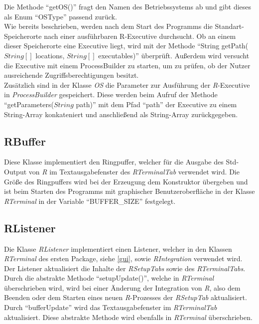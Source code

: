 \documentclass[a4paper, 12pt]{report} %
\begin{document}
Die Methode "`getOS()"' fragt den Namen des Betriebssystems ab und gibt dieses als Enum "`OSType"' passend zurück.\\

Wie bereits beschrieben, werden nach dem Start des Programms die Standart-Speicherorte nach einer ausführbaren R-Executive durchsucht. Ob an einem dieser Speicherorte eine Executive liegt, wird mit der Methode "`String getPath($String[]$ locations, $String[]$ executables)"' überprüft. Außerdem wird versucht die Executive mit einem ProcessBuilder zu starten, um zu prüfen, ob der Nutzer ausreichende Zugriffsberechtigungen besitzt.\\

Zusätzlich sind in der Klasse \textit{OS} die Parameter zur Ausführung der \textit{R}-Executive in \textit{ProcessBuilder} gespeichert. Diese werden beim Aufruf der Methode "`getParameters($String$ path)"' mit dem Pfad "`path"' der Executive zu einem String-Array konkateniert und anschließend als String-Array zurückgegeben.

\subsection{RBuffer} \label{RBuffer}

Diese Klasse implementiert den Ringpuffer, welcher für die Ausgabe des Std-Output von \textit{R} im Textausgabefenster des \textit{RTerminalTab} verwendet wird.
Die Größe des Ringpuffers wird bei der Erzeugung dem Konstruktor übergeben und ist beim Starten des Programms mit graphischer Benutzeroberfläche in der Klasse \textit{RTerminal} in der Variable "`BUFFER\_SIZE"' festgelegt.

\subsection{RListener} \label{RListener}

Die Klasse \textit{RListener} implementiert einen Listener, welcher in den Klassen \textit{RTerminal} des ersten Package, siehe \ref{gui}, sowie \textit{RIntegration} verwendet wird. \\

Der Listener aktualisiert die Inhalte der \textit{RSetupTabs} sowie des \textit{RTerminalTabs}. 
Durch die abstrakte Methode "`setupUpdate()"', welche in \textit{RTerminal} überschrieben wird, wird bei einer Änderung der Integration von \textit{R}, also dem Beenden oder dem Starten eines neuen \textit{R}-Prozesses der \textit{RSetupTab} aktualisiert.
Durch "`bufferUpdate"' wird das Textausgabefenster im \textit{RTerminalTab} aktualisiert. Diese abstrakte Methode wird ebenfalls in \textit{RTerminal} überschrieben.
\end{document}
